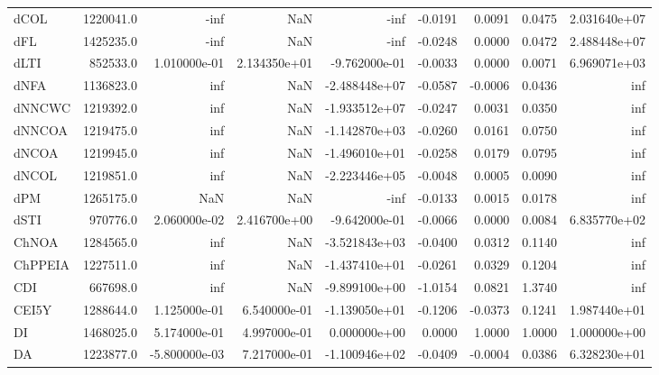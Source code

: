 \begin{tabular}{lrrrrrrrr}
dCOL      &  1220041.0 &          -inf &           NaN &          -inf &    -0.0191 &     0.0091 &     0.0475 &  2.031640e+07 \\
dFL       &  1425235.0 &          -inf &           NaN &          -inf &    -0.0248 &     0.0000 &     0.0472 &  2.488448e+07 \\
dLTI      &   852533.0 &  1.010000e-01 &  2.134350e+01 & -9.762000e-01 &    -0.0033 &     0.0000 &     0.0071 &  6.969071e+03 \\
dNFA      &  1136823.0 &           inf &           NaN & -2.488448e+07 &    -0.0587 &    -0.0006 &     0.0436 &           inf \\
dNNCWC    &  1219392.0 &           inf &           NaN & -1.933512e+07 &    -0.0247 &     0.0031 &     0.0350 &           inf \\
dNNCOA    &  1219475.0 &           inf &           NaN & -1.142870e+03 &    -0.0260 &     0.0161 &     0.0750 &           inf \\
dNCOA     &  1219945.0 &           inf &           NaN & -1.496010e+01 &    -0.0258 &     0.0179 &     0.0795 &           inf \\
dNCOL     &  1219851.0 &           inf &           NaN & -2.223446e+05 &    -0.0048 &     0.0005 &     0.0090 &           inf \\
dPM       &  1265175.0 &           NaN &           NaN &          -inf &    -0.0133 &     0.0015 &     0.0178 &           inf \\
dSTI      &   970776.0 &  2.060000e-02 &  2.416700e+00 & -9.642000e-01 &    -0.0066 &     0.0000 &     0.0084 &  6.835770e+02 \\
ChNOA     &  1284565.0 &           inf &           NaN & -3.521843e+03 &    -0.0400 &     0.0312 &     0.1140 &           inf \\
ChPPEIA   &  1227511.0 &           inf &           NaN & -1.437410e+01 &    -0.0261 &     0.0329 &     0.1204 &           inf \\
CDI       &   667698.0 &           inf &           NaN & -9.899100e+00 &    -1.0154 &     0.0821 &     1.3740 &           inf \\
CEI5Y     &  1288644.0 &  1.125000e-01 &  6.540000e-01 & -1.139050e+01 &    -0.1206 &    -0.0373 &     0.1241 &  1.987440e+01 \\
DI        &  1468025.0 &  5.174000e-01 &  4.997000e-01 &  0.000000e+00 &     0.0000 &     1.0000 &     1.0000 &  1.000000e+00 \\
DA        &  1223877.0 & -5.800000e-03 &  7.217000e-01 & -1.100946e+02 &    -0.0409 &    -0.0004 &     0.0386 &  6.328230e+01 \\

\end{tabular}
